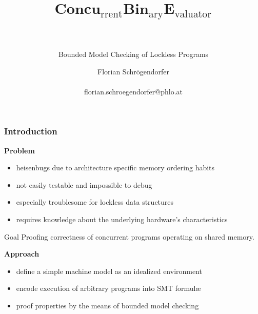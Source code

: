 \documentclass{beamer}
\title{$\textbf{Concu}_{\text{rrent}}\textbf{Bin}_{\text{ary}}\textbf{E}_{\text{valuator}}$\\~\\}
\subtitle{Bounded Model Checking of Lockless Programs}
\author{Florian Schr\"ogendorfer\\~\\\tiny florian.schroegendorfer@phlo.at}
\date{}
\begin{document}
\small

\frame{\titlepage}

\begin{frame}
  \frametitle{Introduction}
  \vfill
  \textbf{Problem}
  \begin{itemize}
    \item heisenbugs due to architecture specific memory ordering habits
    \item not easily testable and impossible to debug
    \item especially troublesome for lockless data structures
    \item requires knowledge about the underlying hardware's characteristics
  \end{itemize}

  \begin{textbox}{Goal}
    Proofing correctness of concurrent programs operating on shared memory.
  \end{textbox}

  \vfill

  \textbf{Approach}
  \begin{itemize}
    \item define a simple machine model as an idealized environment
    \item encode execution of arbitrary programs into SMT formul\ae
    \item proof properties by the means of bounded model checking
  \end{itemize}
\end{frame}
\end{document}
